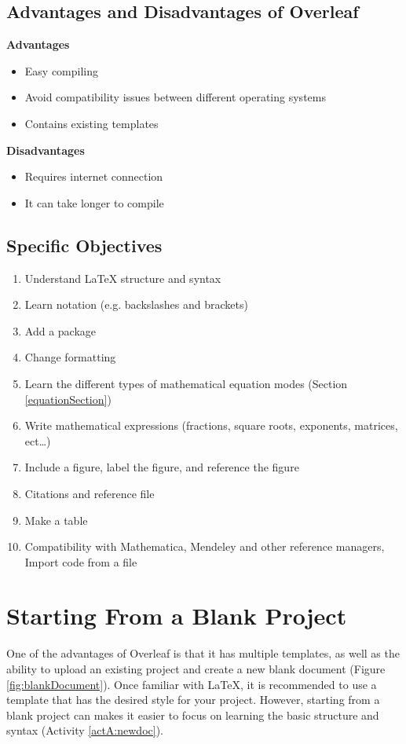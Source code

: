 \documentclass{article}
\begin{document}
\subsection{Advantages and Disadvantages of Overleaf}
\textbf{Advantages}
\begin{itemize}
    \item Easy compiling 
    \item Avoid compatibility issues between different operating systems 
    \item Contains existing templates
\end{itemize}
\textbf{Disadvantages}
\begin{itemize}
    \item Requires internet connection 
    \item It can take longer to compile 
\end{itemize}
\subsection{Specific Objectives}
\begin{enumerate}
    \item Understand LaTeX structure and syntax
    \item Learn notation (e.g. backslashes and brackets)
    \item Add a package 
    \item Change formatting 
    \item Learn the different types of mathematical equation modes (Section \ref{equationSection})
    \item Write mathematical expressions (fractions, square roots, exponents, matrices, ect…) 
    \item Include a figure, label the figure, and reference the figure 
    \item Citations and reference file
    \item Make a table 
    \item Compatibility with Mathematica, Mendeley and other reference managers, Import code from a file 
\end{enumerate}

\newpage 
\section{Starting From a Blank Project}
One of the advantages of Overleaf is that it has multiple templates, as well as the ability to upload an existing project and create a new blank document (Figure \ref{fig:blankDocument}). Once familiar with LaTeX, it is recommended to use a template that has the desired style for your project. However, starting from a blank project can makes it easier to focus on learning the basic structure and syntax (Activity \ref{actA:newdoc}). 
\end{document}

